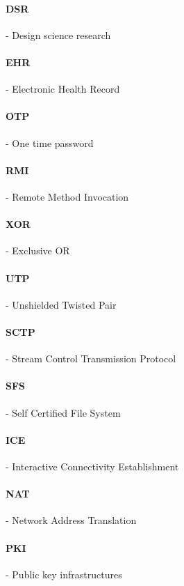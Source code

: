 \paragraph{DSR} - Design science research

\paragraph{EHR} - Electronic Health Record

\paragraph{OTP} - One time password

\paragraph{RMI} - Remote Method Invocation

\paragraph{XOR} - Exclusive OR

\paragraph{UTP} - Unshielded Twisted Pair

\paragraph{SCTP} - Stream Control Transmission Protocol

\paragraph{SFS} - Self Certified File System

\paragraph{ICE} - Interactive Connectivity Establishment

\paragraph{NAT} - Network Address Translation

\paragraph{PKI} - Public key infrastructures

